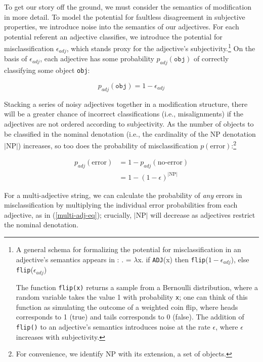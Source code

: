 \documentclass{sp}
\newcommand{\lam}{\ensuremath{\lambda}}
\begin{document}
To get our story off the ground, we must consider the semantics of modification in more detail. To model the potential for faultless disagreement in subjective properties, we introduce noise into the semantics of our adjectives. 
For each potential referent an adjective classifies, we introduce the potential for misclassification $\epsilon_{adj}$, which stands proxy for the adjective's subjectivity.\footnote{A general schema for formalizing the potential for misclassification in an adjective's semantics appears in \Next: 
	\ex.  = \lam x. if \texttt{ADJ}(x) then \texttt{flip}($1-\epsilon_{adj}$), else \texttt{flip}($\epsilon_{adj}$)
	
The function \texttt{flip(x)} returns a sample from a Bernoulli distribution, where a random variable takes the value 1 with probability \texttt{x}; one can think of this function as simulating the outcome of a weighted coin flip, where heads corresponds to 1 (true) and tails corresponds to 0 (false). The addition of \texttt{flip()} to an adjective's semantics introduces noise at the rate $\epsilon$, where $\epsilon$ increases with subjectivity.} 
On the basis of $\epsilon_{adj}$, each adjective has some probability $p_{adj}(\texttt{obj})$ of correctly classifying some object \texttt{obj}: 

\setcounter{equation}{2}
\begin{equation}
p_{adj}(\texttt{obj}) = 1-\epsilon_{adj}
\end{equation}

\noindent
Stacking a series of noisy adjectives together in a modification structure, there will be a greater chance of incorrect classifications (i.e., misalignments) if the adjectives are not ordered according to subjectivity. 
As the number of objects to be classified in the nominal denotation (i.e., the cardinality of the NP denotation $|\textrm{NP}|$) increases, so too does the probability of misclassification $p(\textrm{error})$:\footnote{For convenience, we identify NP with its extension, a set of objects.} 
	
\setcounter{equation}{3}
\begin{align}
p_{adj}(\textrm{error}) &= 1 - p_{adj}(\textrm{no-error}) \nonumber\\
&= 1 - (1-\epsilon)^{|\textrm{NP}|}
\end{align}
	
For a multi-adjective string, we can calculate the probability of \emph{any} errors in misclassification by multiplying the individual error probabilities from each adjective, as in (\ref{multi-adj-eq}); crucially, $|\textrm{NP}|$ will decrease as adjectives restrict the nominal denotation. 
	
\end{document}
